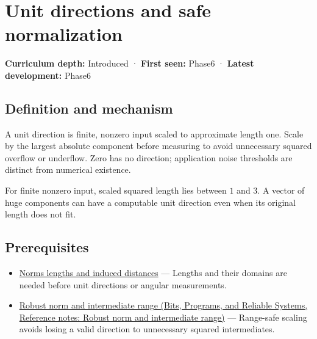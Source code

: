 \hypertarget{appendix-f744e41b95b4}{}\label{referencestart:appendix-f744e41b95b4}
\section{Unit directions and safe normalization}\label{appendix-f744e41b95b4-unit-directions-and-safe-normalization}

\hypertarget{appendix-f744e41b95b4-unit-directions-and-safe-normalization}{}

\textbf{Curriculum depth:} Introduced · \textbf{First seen:} Phase6 · \textbf{Latest development:} Phase6

\begin{allmightroledefinition}

\subsection{Definition and mechanism}\label{appendix-f744e41b95b4-definition-and-mechanism}

\hypertarget{appendix-f744e41b95b4-definition-and-mechanism}{}

A unit direction is finite, nonzero input scaled to approximate length one. Scale by the largest absolute component before measuring to avoid unnecessary squared overflow or underflow. Zero has no direction; application noise thresholds are distinct from numerical existence.

\end{allmightroledefinition}

For finite nonzero input, scaled squared length lies between \(1\) and \(3\). A vector of huge components can have a computable unit direction even when its original length does not fit.

\subsection{Prerequisites}\label{appendix-f744e41b95b4-prerequisites}

\hypertarget{appendix-f744e41b95b4-prerequisites}{}

\begin{itemize}
\tightlist
\item
  \hyperref[appendix-49933872bb51]{Norms lengths and induced distances} --- Lengths and their domains are needed before unit directions or angular measurements.
\item
  \href{../01-Bits-Programs-and-Reliable-Systems/main.pdf\#nameddest=appendix-7f1e17dcafb1}{Robust norm and intermediate range (Bits, Programs, and Reliable Systems, Reference notes: Robust norm and intermediate range)} --- Range-safe scaling avoids losing a valid direction to unnecessary squared intermediates.
\end{itemize}

